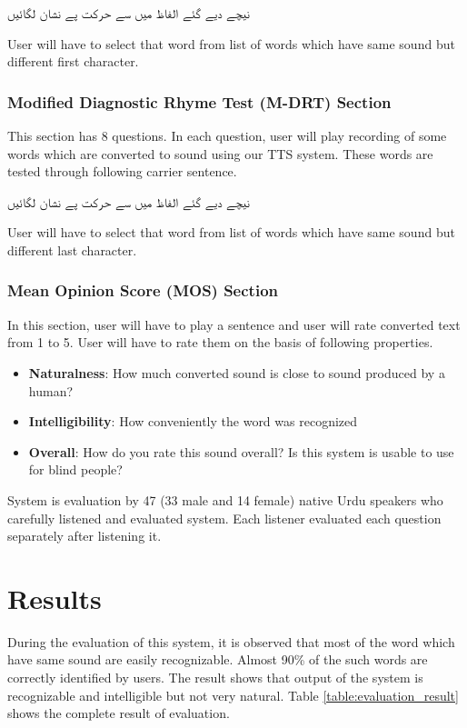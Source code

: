   \texturdu{نیچے دیے گئے الفاظ میں سے حرکت پے نشان لگائیں}

User will have to select that word from list of words which have same sound but different first character.

\subsubsection{Modified Diagnostic Rhyme Test (M-DRT) Section}

This section has 8 questions. In each question, user will play recording of some words which are converted to sound using our TTS system. These words are tested through following carrier sentence.

  \texturdu{نیچے دیے گئے الفاظ میں سے حرکت پے نشان لگائیں}

User will have to select that word from list of words which have same sound but different last character.

\subsubsection{Mean Opinion Score (MOS) Section}
In this section, user will have to play a sentence and user will rate converted text from 1 to 5. User will have to rate them on the basis of following properties.

\begin{itemize}
  \item {\textbf{Naturalness}:} How much converted sound is close to sound produced by a human? 
  \item {\textbf{Intelligibility}:} How conveniently the word was recognized
  \item {\textbf{Overall}:} How do you rate this sound overall? Is this system is usable to use for blind people?
\end{itemize}

System is evaluation by 47 (33 male and 14 female) native Urdu speakers who carefully listened and evaluated system. Each listener evaluated each question separately after listening it. 

\section{Results}

During the evaluation of this system, it is observed that most of the word which have same sound are easily recognizable. Almost 90\% of the such words are correctly identified by users. The result shows that output of the system is recognizable and intelligible but not very natural. Table \ref{table:evaluation_result} shows the complete result of evaluation.

